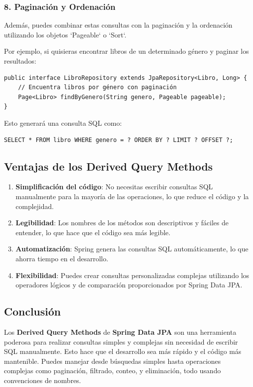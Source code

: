 \documentclass[11pt]{article}
\begin{document}
\subsubsection{8. Paginación y Ordenación}
\label{sec:org6e9aad7}
Además, puedes combinar estas consultas con la paginación y la ordenación utilizando los objetos `Pageable` o `Sort`.

Por ejemplo, si quisieras encontrar libros de un determinado género y paginar los resultados:

\begin{verbatim}
public interface LibroRepository extends JpaRepository<Libro, Long> {
    // Encuentra libros por género con paginación
    Page<Libro> findByGenero(String genero, Pageable pageable);
}
\end{verbatim}

Esto generará una consulta SQL como:

\begin{verbatim}
SELECT * FROM libro WHERE genero = ? ORDER BY ? LIMIT ? OFFSET ?;
\end{verbatim}

\subsection{Ventajas de los Derived Query Methods}
\label{sec:org25ae34c}
\begin{enumerate}
\item \textbf{\textbf{Simplificación del código}}: No necesitas escribir consultas SQL manualmente para la mayoría de las operaciones, lo que reduce el código y la complejidad.
\item \textbf{\textbf{Legibilidad}}: Los nombres de los métodos son descriptivos y fáciles de entender, lo que hace que el código sea más legible.
\item \textbf{\textbf{Automatización}}: Spring genera las consultas SQL automáticamente, lo que ahorra tiempo en el desarrollo.
\item \textbf{\textbf{Flexibilidad}}: Puedes crear consultas personalizadas complejas utilizando los operadores lógicos y de comparación proporcionados por Spring Data JPA.
\end{enumerate}

\subsection{Conclusión}
\label{sec:org1fb701e}
Los \textbf{\textbf{Derived Query Methods}} de \textbf{\textbf{Spring Data JPA}} son una herramienta poderosa para realizar consultas simples y complejas sin necesidad de escribir SQL manualmente. Esto hace que el desarrollo sea más rápido y el código más mantenible. Puedes manejar desde búsquedas simples hasta operaciones complejas como paginación, filtrado, conteo, y eliminación, todo usando convenciones de nombres.
\end{document}
